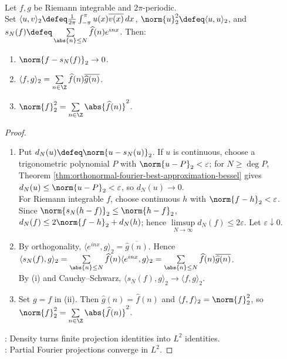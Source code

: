 \begin{theorem} \label{thm:parseval-fourier-series} \\
Let $f,g$ be Riemann integrable and $2\pi$-periodic.\\
Set $\langle u,v\rangle_2\defeq\frac{1}{2\pi}\int_{-\pi}^{\pi}u(x)\overline{v(x)}\,dx$, $\norm{u}_2^2\defeq\langle u,u\rangle_2$, and $s_N(f)\defeq\sum\limits_{\abs{n}\leq N}\widehat f(n)e^{inx}$. Then:
\begin{enumerate}[label=(\roman*)]
\setlength{\itemsep}{0pt}
\item $\norm{f-s_N(f)}_2\to0$.
\item $\langle f,g\rangle_2=\sum\limits_{n\in\Z}\widehat f(n)\overline{\widehat g(n)}$.
\item $\norm{f}_2^2=\sum\limits_{n\in\Z}\abs{\widehat f(n)}^2$.
\end{enumerate}
\begin{proof}
\begin{enumerate}[label=(\roman*)]
\setlength{\itemsep}{0pt}
\item Put $d_N(u)\defeq\norm{u-s_N(u)}_2$. If $u$ is continuous, choose a trigonometric polynomial $P$ with $\norm{u-P}_2<\varepsilon$; for $N\geq\deg P$, Theorem \ref{thm:orthonormal-fourier-best-approximation-bessel} gives $d_N(u)\leq\norm{u-P}_2<\varepsilon$, so $d_N(u)\to0$.\\
For Riemann integrable $f$, choose continuous $h$ with $\norm{f-h}_2<\varepsilon$.\\
Since $\norm{s_N(h-f)}_2\leq\norm{h-f}_2$, $d_N(f)\leq2\norm{f-h}_2+d_N(h)$; hence $\limsup\limits_{N\to\infty}d_N(f)\leq2\varepsilon$. Let $\varepsilon\downarrow0$.
\item By orthogonality, $\langle e^{inx},g\rangle_2=\overline{\widehat g(n)}$. Hence $\langle s_N(f),g\rangle_2=\sum\limits_{\abs{n}\leq N}\widehat f(n)\langle e^{inx},g\rangle_2=\sum\limits_{\abs{n}\leq N}\widehat f(n)\overline{\widehat g(n)}$.\\
By (i) and Cauchy--Schwarz, $\langle s_N(f),g\rangle_2\to\langle f,g\rangle_2$.
\item Set $g=f$ in (ii). Then $\widehat g(n)=\widehat f(n)$ and $\langle f,f\rangle_2=\norm{f}_2^2$, so $\norm{f}_2^2=\sum\limits_{n\in\Z}\abs{\widehat f(n)}^2$.
\end{enumerate}
: Density turns finite projection identities into $L^2$ identities.\\
: Partial Fourier projections converge in $L^2$.
\end{proof}
\end{theorem}

